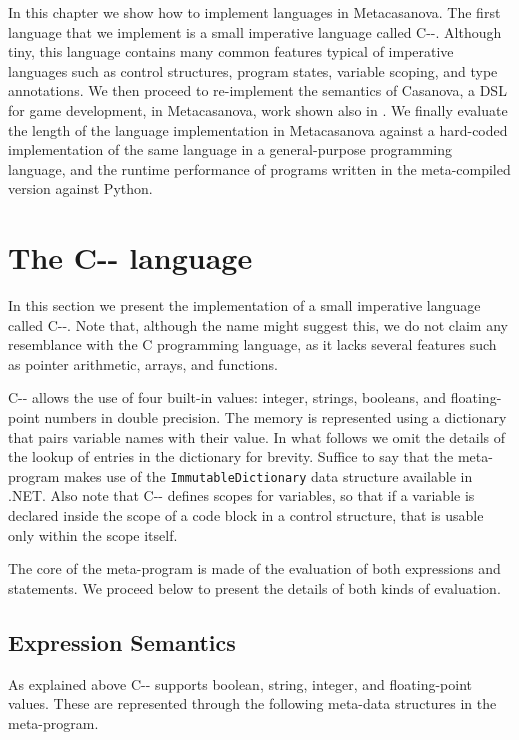 In this chapter we show how to implement languages in Metacasanova. The first language that we implement is a small imperative language called C-{}-. Although tiny, this language contains many common features typical of imperative languages such as control structures, program states, variable scoping, and type annotations. We then proceed to re-implement the semantics of Casanova, a DSL for game development, in Metacasanova, work shown also in \cite{DiGiacomo2017}. We finally evaluate the length of the language implementation in Metacasanova against a hard-coded implementation of the same language in a general-purpose programming language, and the runtime performance of programs written in the meta-compiled version against Python.

\section{The C-{}- language}
In this section we present the implementation of a small imperative language called C-{}-. Note that, although the name might suggest this, we do not claim any resemblance with the C programming language, as it lacks several features such as pointer arithmetic, arrays, and functions.

C-{}- allows the use of four built-in values: integer, strings, booleans, and floating-point numbers in double precision. The memory is represented using a dictionary that pairs variable names with their value. In what follows we omit the details of the lookup of entries in the dictionary for brevity. Suffice to say that the meta-program makes use of the \texttt{ImmutableDictionary} data structure available in .NET. Also note that C-{}- defines scopes for variables, so that if a variable is declared inside the scope of a code block in a control structure, that is usable only within the scope itself.

The core of the meta-program is made of the evaluation of both expressions and statements. We proceed below to present the details of both kinds of evaluation.

\subsection{Expression Semantics}
\label{subsec:ch_mcnv_languages_expression_semantics}
As explained above C-{}- supports boolean, string, integer, and floating-point values. These are represented through the following meta-data structures in the meta-program.

